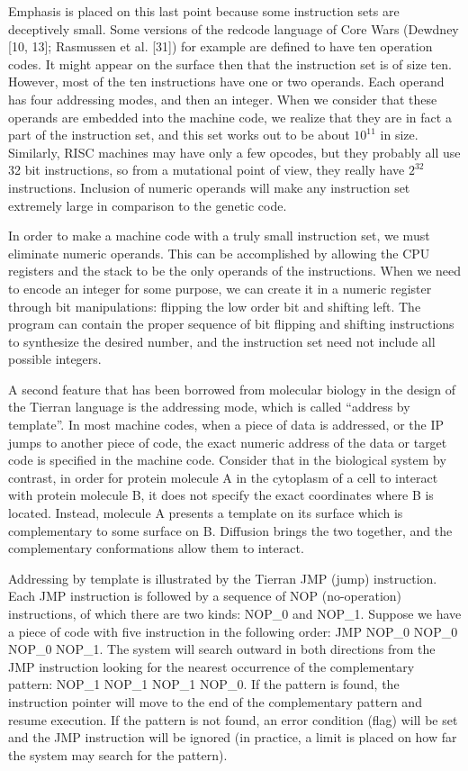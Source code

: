 Emphasis is placed on this last point because some instruction sets are
deceptively small.  Some versions of the redcode language of Core Wars
(Dewdney [10, 13]; Rasmussen et al. [31]) for example are defined to have
ten operation codes.  It might appear on the surface then that the
instruction set is of size ten.  However, most of the ten instructions have
one or two operands.  Each operand has four addressing modes, and then an
integer.  When we consider that these operands are embedded into the machine
code, we realize that they are in fact a part of the instruction set, and
this set works out to be about $10^{11}$ in size.  Similarly, RISC machines
may have only a few opcodes, but they probably all use 32 bit instructions,
so from a mutational point of view, they really have $2^{32}$ instructions.
Inclusion of numeric operands will make any instruction set extremely large
in comparison to the genetic code.

In order to make a machine code with a truly small instruction set, we must
eliminate numeric operands.  This can be accomplished by allowing the CPU
registers and the stack to be the only operands of the instructions.  When
we need to encode an integer for some purpose, we can create it in a numeric
register through bit manipulations: flipping the low order bit and shifting
left.  The program can contain the proper sequence of bit flipping and shifting
instructions to synthesize the desired number, and the instruction set need
not include all possible integers.

A second feature that has been borrowed from molecular biology in the design
of the Tierran language is the addressing mode, which is called ``address
by template''.  In most machine codes, when a piece of data is addressed, or
the IP jumps to another piece of code, the exact numeric address of the data
or target code is specified in the machine code.  Consider that in the
biological system by contrast, in order for protein molecule A in the cytoplasm
of a cell to interact with protein molecule B, it does not
specify the exact coordinates where B is located.  Instead, molecule A
presents a template on its surface which is complementary to some surface on
B.  Diffusion brings the two together, and the complementary conformations
allow them to interact.

Addressing by template is illustrated by the Tierran JMP (jump) instruction.
Each JMP instruction is followed by a sequence of NOP (no-operation)
instructions, of which there are two kinds: NOP\_0 and NOP\_1.  Suppose we
have a piece of code with five instruction in the following order:
JMP NOP\_0 NOP\_0 NOP\_0 NOP\_1.  The system will search outward in both
directions from the JMP instruction looking for the nearest occurrence of the
complementary pattern: NOP\_1 NOP\_1 NOP\_1 NOP\_0.  If the pattern is found,
the instruction pointer will move to the end of the complementary pattern
and resume execution.  If the pattern is not found, an error condition (flag)
will be set and the JMP instruction will be ignored (in practice, a limit
is placed on how far the system may search for the pattern).

